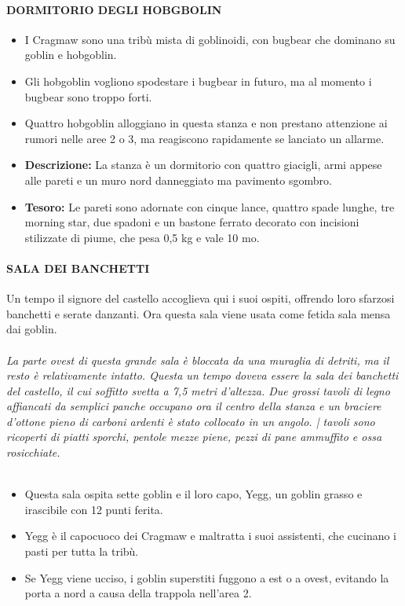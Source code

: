 \documentclass{article}
\begin{document}
\paragraph{DORMITORIO DEGLI HOBGBOLIN}
\begin{itemize}
    \item I Cragmaw sono una tribù mista di goblinoidi, con bugbear che dominano su goblin e hobgoblin.
    \item Gli hobgoblin vogliono spodestare i bugbear in futuro, ma al momento i bugbear sono troppo forti.
    \item Quattro hobgoblin alloggiano in questa stanza e non prestano attenzione ai rumori nelle aree 2 o 3, ma reagiscono rapidamente se lanciato un allarme.
    \item \textbf{Descrizione:} La stanza è un dormitorio con quattro giacigli, armi appese alle pareti e un muro nord danneggiato ma pavimento sgombro.
    \item \textbf{Tesoro:} Le pareti sono adornate con cinque lance, quattro spade lunghe, tre morning star, due spadoni e un bastone ferrato decorato con incisioni stilizzate di piume, che pesa 0,5 kg e vale 10 mo.
\end{itemize}
\paragraph{SALA DEI BANCHETTI}
Un tempo il signore del castello accoglieva qui i suoi ospiti,
offrendo loro sfarzosi banchetti e serate danzanti. Ora questa
sala viene usata come fetida sala mensa dai goblin. \\
\\
\textit{La parte ovest di questa grande sala è bloccata da una muraglia
di detriti, ma il resto è relativamente intatto. Questa un tempo
doveva essere la sala dei banchetti del castello, il cui soffitto
svetta a 7,5 metri d’altezza. Due grossi tavoli di legno affiancati
da semplici panche occupano ora il centro della stanza e un
braciere d’ottone pieno di carboni ardenti è stato collocato
in un angolo. | tavoli sono ricoperti di piatti sporchi, pentole
mezze piene, pezzi di pane ammuffito e ossa rosicchiate.}\\
\\
\begin{itemize}
    \item Questa sala ospita sette goblin e il loro capo, Yegg, un goblin grasso e irascibile con 12 punti ferita.
    \item Yegg è il capocuoco dei Cragmaw e maltratta i suoi assistenti, che cucinano i pasti per tutta la tribù.
    \item Se Yegg viene ucciso, i goblin superstiti fuggono a est o a ovest, evitando la porta a nord a causa della trappola nell'area 2.
\end{itemize}
\end{document}
